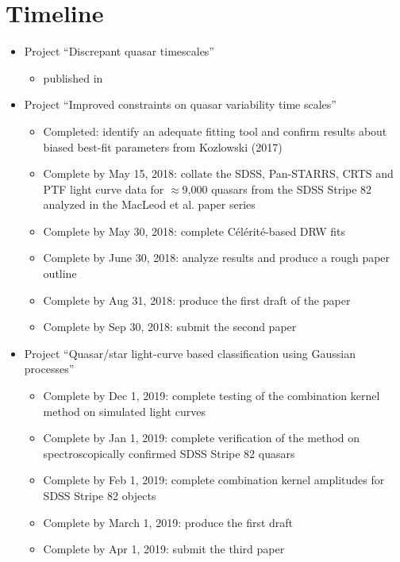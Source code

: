 \documentclass[modern]{aastex62}
\begin{document}
\section{Timeline}
\begin{itemize}
    \item Project ``Discrepant quasar timescales''
     \begin{itemize}
     	\item published in \cite{suberlak2017}
     \end{itemize}

    \item Project ``Improved constraints on quasar variability time scales''
    \begin{itemize}
        \item Completed: identify an adequate fitting tool and confirm results about biased
  best-fit parameters from Kozlowski (2017)
        \item Complete by May 15, 2018: collate the SDSS, Pan-STARRS, CRTS and PTF
  light curve data for $\approx$9,000 quasars from the SDSS Stripe 82 analyzed in 
  the MacLeod et al. paper series
        \item Complete by May 30, 2018: complete C\'el\'erit\'e-based DRW fits
        \item Complete by June 30, 2018: analyze results and produce a rough paper outline
        \item Complete by Aug 31, 2018: produce the first draft of the paper  
        \item Complete by Sep 30, 2018: submit the second paper  
     \end{itemize}
    \item Project ``Quasar/star light-curve based classification using Gaussian processes''
    \begin{itemize}
    	\item Complete by Dec 1, 2019: complete testing of the combination kernel method on simulated light curves 
    	\item Complete by Jan 1, 2019: complete verification of the method on spectroscopically confirmed SDSS Stripe 82 quasars
    	\item Complete by Feb 1, 2019: complete combination kernel amplitudes for SDSS Stripe 82 objects
    	\item Complete by March 1, 2019: produce the first draft
    	\item Complete by Apr 1, 2019: submit the third paper 
    \end{itemize}

 \end{itemize}




\end{document}
